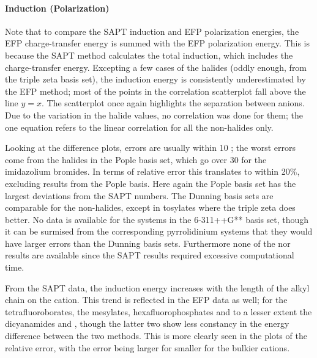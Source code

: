 

\paragraph{Induction (Polarization)}
Note that to compare the SAPT induction and EFP polarization energies, the EFP charge-transfer energy is summed with the EFP polarization energy. 
This is because the SAPT method calculates the total induction, which includes the charge-transfer energy.
Excepting a few cases of the halides (oddly enough, from the triple zeta basis set), the induction energy is consistently underestimated by the EFP method; most of the points in the correlation scatterplot fall above the line $ y= x $.
The scatterplot once again highlights the separation between anions.
Due to the variation in the halide values, no correlation was done for them; the one equation refers to the linear correlation for all the non-halides only.

Looking at the difference plots, errors are usually within 10 \enUnit; the worst errors come from the halides in the Pople basis set, which go over 30 \enUnit for the imidazolium bromides.  
In terms of relative error this translates to within 20\%, excluding results from the Pople basis.
Here again the Pople basis set has the largest deviations from the SAPT numbers. 
The Dunning basis sets are comparable for the non-halides, except in tosylates where the triple zeta does better. 
No data is available for the  systems in the 6-311++G** basis set, though it can be surmised from the corresponding pyrrolidinium systems that they would have larger errors than the Dunning basis sets.
Furthermore none of the  nor  results are available since the SAPT results required excessive computational time.

From the SAPT data, the induction energy increases with the length of the alkyl chain on the cation. 
This trend is reflected in the EFP data as well; for the tetrafluoroborates, the mesylates, hexafluorophosphates and to a lesser extent the dicyanamides and \ntf, though the latter two show less constancy in the energy difference between the two methods.
This is more clearly seen in the plots of the relative error, with the error being larger for smaller for the bulkier cations.


